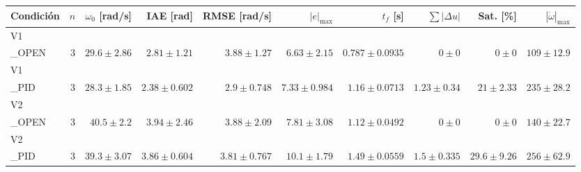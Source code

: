 \begin{tabular}{lrrrrrrrrr}
\hline
Condici\'on & $n$ & $\omega_0$ [rad/s] & IAE [rad] & RMSE [rad/s] & $|e|_{\max}$ & $t_f$ [s] & $\sum|\Delta u|$ & Sat. [\%] & $|\dot{\omega}|_{\max}$ \\
\hline
V1\\_OPEN & 3 & $29.6 \pm 2.86$ & $2.81 \pm 1.21$ & $3.88 \pm 1.27$ & $6.63 \pm 2.15$ & $0.787 \pm 0.0935$ & $0 \pm 0$ & $0 \pm 0$ & $109 \pm 12.9$ \\
V1\\_PID & 3 & $28.3 \pm 1.85$ & $2.38 \pm 0.602$ & $2.9 \pm 0.748$ & $7.33 \pm 0.984$ & $1.16 \pm 0.0713$ & $1.23 \pm 0.34$ & $21 \pm 2.33$ & $235 \pm 28.2$ \\
V2\\_OPEN & 3 & $40.5 \pm 2.2$ & $3.94 \pm 2.46$ & $3.88 \pm 2.09$ & $7.81 \pm 3.08$ & $1.12 \pm 0.0492$ & $0 \pm 0$ & $0 \pm 0$ & $140 \pm 22.7$ \\
V2\\_PID & 3 & $39.3 \pm 3.07$ & $3.86 \pm 0.604$ & $3.81 \pm 0.767$ & $10.1 \pm 1.79$ & $1.49 \pm 0.0559$ & $1.5 \pm 0.335$ & $29.6 \pm 9.26$ & $256 \pm 62.9$ \\
\hline
\end{tabular}

